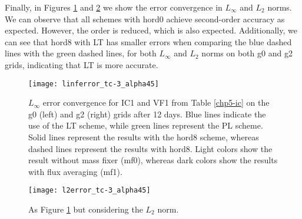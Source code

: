 \newpage
Finally, in Figures \ref{chp-advcs-sec-exp-adv2-linf} and \ref{chp-advcs-sec-exp-adv2-l2} we show the error convergence in $L_{\infty}$ and $L_{2}$ norms.
We can observe that all schemes with hord0 achieve second-order accuracy as expected.
However, the order is reduced, which is also expected.
Additionally, we can see that hord8 with LT has smaller errors when comparing the blue dashed lines with the green dashed lines, 
for both $L_{\infty}$ and $L_{2}$ norms on both g0 and g2 grids, indicating that LT is more accurate.
\begin{figure}[!htb]
	\centering
	\texttt{[image: linferror\_tc-3\_alpha45]}
	\caption{
$L_{\infty}$ error convergence for IC1 and VF1 from Table \ref{chp5-ic} on the g0 (left) and g2 (right) grids after 12 days.
Blue lines indicate the use of the LT scheme, while green lines represent the PL scheme.
Solid lines represent the results with the hord8 scheme, whereas dashed lines represent the results with hord8.
Light colors show the result without mass fixer (mf0), whereas dark colors show the results with flux averaging (mf1).\label{chp-advcs-sec-exp-adv2-linf}}
\end{figure}

\begin{figure}[!htb]
	\centering
	\texttt{[image: l2error\_tc-3\_alpha45]}
	\caption{As Figure \ref{chp-advcs-sec-exp-adv2-linf} but considering the $L_2$ norm. \label{chp-advcs-sec-exp-adv2-l2}}
\end{figure}

\newpage
